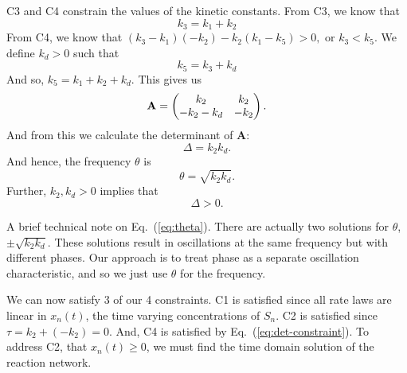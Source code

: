 \documentclass{bmcart}
\newcommand{\eqn}[1]{Eq.~(\ref{#1})}
\begin{document}
C3 and C4 constrain the values of the kinetic constants.
From C3, we know that 
\begin{equation}
k_3 = k_1 + k_2
\label{eq:k3}
\end{equation}
From C4, we know that $(k_3 - k_1)(-k_2) - k_2(k_1 - k_5) > 0,$ or $k_3 < k_5.$
We define $k_d >0$ such that
\begin{equation}
k_5  = k_3 + k_d 
\label{eq:k5}
\end{equation}
And so, $k_5 = k_1 + k_2 + k_d$.
This gives us
\begin{equation}
{\bf A} = \left( \begin{matrix}
     k_2 & k_2  \\
     -k_2 -k_d & -k_2
\end{matrix} \right). \label{eq:Amatrix}
\end{equation}
And from this we calculate the determinant of {\bf A}:
\begin{equation}
    \Delta  = k_2 k_d \label{eq:det} .
\end{equation}
And hence, the frequency $\theta$ is
\begin{equation}
\theta = \sqrt{k_2 k_d} .
\label{eq:theta}
\end{equation}
Further, $k_2, k_d > 0$ implies that
\begin{equation}
    \Delta  >  0. \label{eq:det-constraint}
\end{equation}

A brief technical note on \eqn{eq:theta}. There are actually two solutions for $\theta$, 
$\pm \sqrt{k_2 k_d}$. These solutions result in oscillations at the same frequency but with different phases. Our approach is to treat phase as a separate oscillation characteristic, and so we just use $\theta$ for the frequency.

We can now satisfy 3 of our 4 constraints. C1 is satisfied since all rate laws are linear in $x_n (t)$, the time varying concentrations of $S_n$. C2 is satisfied since $\tau = k_2 + (- k_2) = 0.$ And, C4 is satisfied by \eqn{eq:det-constraint}. To address C2, that $x_n(t) \geq 0$, we must find the time domain solution of the reaction network.
\end{document}
